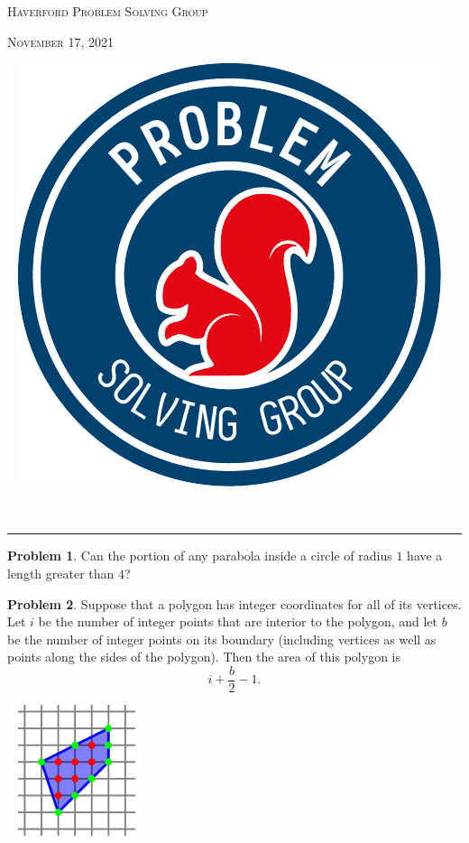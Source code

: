 \documentclass{scrartcl}
\theoremstyle{definition}
\newtheorem{prob}{Problem}
\begin{document}
	\noindent\begin{minipage}{.5\textwidth}{}
		\textsc{Haverford Problem Solving Group}

		\textsc{November 17, 2021}
	\end{minipage}\hfill
	\begin{minipage}{.4\textwidth}{}
		\ \hfill
		\includegraphics[height = .9in]{psg_logo}
	\end{minipage}\\[.5em]
	\hrule

	\setcounter{prob}{5}
	\begin{prob}
		Can the portion of any parabola inside a circle of radius \(1\) have a length greater than \(4\)?
	\end{prob}

	\setcounter{prob}{9}

	\begin{minipage}{.8\textwidth}{}
		\begin{prob}%
			Suppose that a polygon has integer coordinates for all of its vertices. Let \(i\) be the number of integer points that are interior to the polygon, and let \(b\) be the number of integer points on its boundary (including vertices as well as points along the sides of the polygon). Then the area of this polygon is \[
				i + \frac{b}{2} - 1.
			\]
		\end{prob}
	\end{minipage}
	\begin{minipage}{.17\textwidth}{}
		\ \hfill
		\includegraphics[width=.9\textwidth]{pick}
	\end{minipage}
\end{document}
